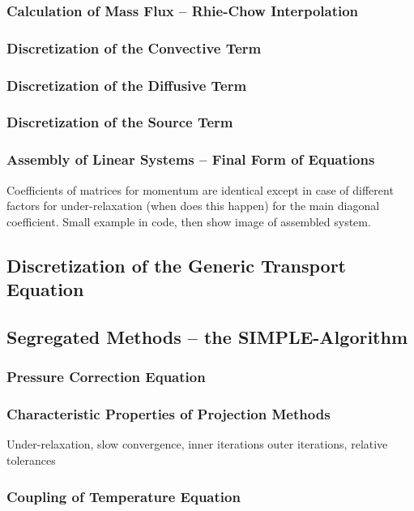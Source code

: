 \documentclass[article,type=msc,colorback,accentcolor=tud2a]{tudthesis}
\begin{document}
      \subsubsection{Calculation of Mass Flux -- Rhie-Chow Interpolation}
      \subsubsection{Discretization of the Convective Term}
      \subsubsection{Discretization of the Diffusive Term}
      \subsubsection{Discretization of the Source Term}
      \subsubsection{Assembly of Linear Systems -- Final Form of Equations}
         Coefficients of matrices for momentum are identical except in case of different factors for under-relaxation (when does this happen) for the main diagonal coefficient. Small example in code, then show image of assembled system.

    \subsection{Discretization of the Generic Transport Equation}

    \subsection{Segregated Methods -- the SIMPLE-Algorithm}
      
      \subsubsection{Pressure Correction Equation}
      \subsubsection{Characteristic Properties of Projection Methods}

        Under-relaxation, slow convergence, inner iterations outer iterations, relative tolerances

      \subsubsection{Coupling of Temperature Equation}
\end{document}
